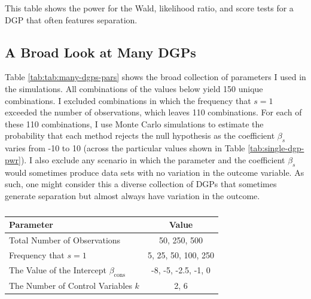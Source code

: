 \documentclass[
]{article}
\begin{document}
\renewcommand{\captiontext}{}
\renewcommand{\notetext}{This table shows the power for the Wald, likelihood ratio, and score tests for a DGP that often features separation.}
\begin{table}[!h]
\caption{\label{tab:single-dgp-pwr}}
\centering
\fontsize{10}{12}\selectfont
\begin{threeparttable}
   
\begin{tablenotes}[para]
This table shows the power for the Wald, likelihood ratio, and score tests for a DGP that often features separation.
\end{tablenotes}
\end{threeparttable}
\end{table}

\hypertarget{a-broad-look-at-many-dgps}{%
\subsection{A Broad Look at Many DGPs}\label{a-broad-look-at-many-dgps}}

Table \ref{tab:tab:many-dgps-pars} shows the broad collection of
parameters I used in the simulations. All combinations of the values
below yield 150 unique combinations. I excluded combinations in which
the frequency that \(s = 1\) exceeded the number of observations, which
leaves 110 combinations. For each of these 110 combinations, I use Monte
Carlo simulations to estimate the probability that each method rejects
the null hypothesis as the coefficient \(\beta_s\) varies from -10 to 10
(across the particular values shown in Table \ref{tab:single-dgp-pwr}).
I also exclude any scenario in which the parameter and the coefficient
\(\beta_s\) would sometimes produce data sets with no variation in the
outcome variable. As such, one might consider this a diverse collection
of DGPs that sometimes generate separation but almost always have
variation in the outcome.

\renewcommand{\captiontext}{}
\renewcommand{\notetext}{}
\begin{table}[!h]
\caption{\label{tab:many-dgps-pars}}
\centering
\fontsize{10}{12}\selectfont
\begin{threeparttable}
\begin{tabular}{lc}
\toprule
Parameter & Value        \\
\midrule
Total Number of Observations & 50, 250, 500 \\
Frequency that $s = 1$    &   5, 25, 50, 100, 250 \\
The Value of the Intercept $\beta_{\text{cons}}$ & -8, -5, -2.5, -1, 0 \\
The Number of Control Variables $k$ & 2, 6 \\
\bottomrule
\end{tabular}\begin{tablenotes}[para]

\end{tablenotes}
\end{threeparttable}
\end{table}
\end{document}

